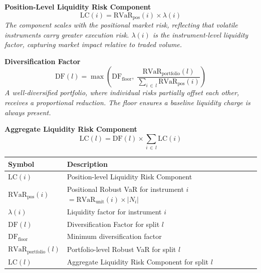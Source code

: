 \documentclass[9pt, a4paper]{extarticle}
\newenvironment{formulabox}{\par\addvspace{4pt}}{\par\addvspace{4pt}}
\newcommand{\vartableheader}{%
    \textbf{Symbol} & \textbf{Description}\\
}
\begin{document}
\begin{formulabox}
\textbf{Position-Level Liquidity Risk Component}
\begin{equation*}
    \mathrm{LC}(i) =
        \mathrm{RVaR}_{\mathrm{pos}}(i) \times \lambda(i)
\end{equation*}
\textit{The component scales with the positional market risk, reflecting that
volatile instruments carry greater execution risk. $\lambda(i)$ is the
instrument-level liquidity factor, capturing market impact relative to traded
volume.}
\end{formulabox}

\begin{formulabox}
\textbf{Diversification Factor}
\begin{equation*}
    \mathrm{DF}(l) =
        \max\!\left(
            \mathrm{DF}_{\mathrm{floor}},\;
            \frac{\mathrm{RVaR}_{\mathrm{portfolio}}(l)}
                 {\displaystyle\sum_{i \,\in\, l} \mathrm{RVaR}_{\mathrm{pos}}(i)}
        \right)
\end{equation*}
\textit{A well-diversified portfolio, where individual risks partially offset
each other, receives a proportional reduction. The floor ensures a baseline
liquidity charge is always present.}
\end{formulabox}

\begin{formulabox}
\textbf{Aggregate Liquidity Risk Component}
\begin{equation*}
    \mathrm{LC}(l) =
        \mathrm{DF}(l) \times \sum_{i \,\in\, l} \mathrm{LC}(i)
\end{equation*}
\end{formulabox}

\begin{tabularx}{\linewidth}{lX}
\toprule
\vartableheader
\midrule
$\mathrm{LC}(i)$                             & Position-level Liquidity Risk Component \\
$\mathrm{RVaR}_{\mathrm{pos}}(i)$           & Positional Robust VaR for instrument $i$
                                               $= \mathrm{RVaR}_{\mathrm{unit}}(i) \times |N_i|$ \\
$\lambda(i)$                                 & Liquidity factor for instrument $i$ \\
$\mathrm{DF}(l)$                             & Diversification Factor for split $l$ \\
$\mathrm{DF}_{\mathrm{floor}}$              & Minimum diversification factor \\
$\mathrm{RVaR}_{\mathrm{portfolio}}(l)$     & Portfolio-level Robust VaR for split $l$ \\
$\mathrm{LC}(l)$                             & Aggregate Liquidity Risk Component for split $l$ \\
\bottomrule
\end{tabularx}
\end{document}
